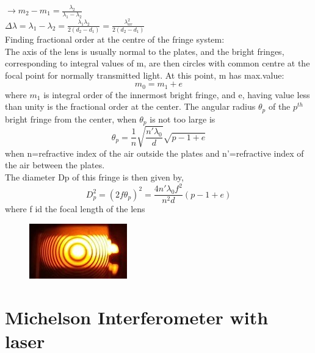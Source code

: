 \documentclass[12pt]{report}
\begin{document}
	$\rightarrow m_2-m_1 = \frac{\lambda_2}{\lambda_1-\lambda_2}$\\
	$\Delta\lambda = \lambda_1-\lambda_2 = \frac{\lambda_1\lambda_2}{2(d_2-d_1)} = \frac{\lambda^2_{av}}{2(d_2-d_1)} $\\
	Finding fractional order at the centre of the fringe system:\\The axis of the lens is usually normal to the plates, and the bright fringes, corresponding to integral values of m, are then circles with common centre at the focal point for normally transmitted light. At this point, m has max.value:\\
	$$m_0 = m_1 + e$$
	where $m_1$ is integral order of the innermost bright fringe, and e, having value less than unity  is the fractional order at the center. The angular radius $\theta_p$ of the $p^{th}$ bright fringe from the center, when $\theta_p$ is not too large is
	$$ \theta_p = \frac{1}{n}\sqrt{\frac{n'\lambda_0}{d}}\sqrt{p-1+e}$$
	when n=refractive index of the air outside the plates and n'=refractive index of the air between the plates. \\The diameter Dp of this fringe is then given by,
	$$D^2_p = (2f\theta_p)^2 = \frac{4n'\lambda_0f^2}{n^2d}(p-1+e)$$
	where f id the focal length of the lens
	\begin{figure}[h]
		\centering
		\includegraphics{4.png}
	\end{figure}
	\newpage
	\section{Michelson Interferometer with laser}
	
\end{document}
